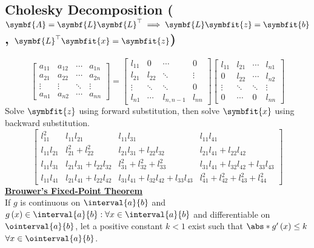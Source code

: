 \documentclass{article}
\begin{document}
\begin{minipage}[t]{126.1962963mm}
    \subsection{Cholesky Decomposition (\texorpdfstring{\(\symbf{A} = \symbf{L} \symbf{L}^\top \implies \symbf{L} \symbfit{z} = \symbfit{b}\), \(\symbf{L}^\top \symbfit{x} = \symbfit{z}\)}{A = L LT => L z = b, LT x = z})}
    \begin{equation*}
        \begin{bmatrix}
            a_{11} & a_{12} & \cdots & a_{1n} \\
            a_{21} & a_{22} & \cdots & a_{2n} \\
            \vdots & \vdots & \ddots & \vdots \\
            a_{n1} & a_{n2} & \cdots & a_{nn}
        \end{bmatrix} =
        \begin{bmatrix}
            l_{11} & 0      & \cdots    & 0      \\
            l_{21} & l_{22} & \ddots    & \vdots \\
            \vdots & \ddots & \ddots    & 0      \\
            l_{n1} & \cdots & l_{n,n-1} & l_{nn}
        \end{bmatrix}
        \begin{bmatrix}
            l_{11} & l_{21} & \cdots & l_{n1} \\
            0      & l_{22} & \cdots & l_{n2} \\
            \vdots & \ddots & \ddots & \vdots \\
            0      & \cdots & 0      & l_{nn}
        \end{bmatrix}
    \end{equation*}
    Solve \(\symbfit{z}\) using forward substitution, then solve \(\symbfit{x}\) using backward substitution.
    \begin{equation*}
        \begin{bmatrix}
            l_{11}^2      & l_{11} l_{21}               & l_{11} l_{31}                             & l_{11} l_{41}                             \\
            l_{11} l_{21} & l_{21}^2+l_{22}^2           & l_{21} l_{31}+l_{22} l_{32}               & l_{21} l_{41}+l_{22} l_{42}               \\
            l_{11} l_{31} & l_{21} l_{31}+l_{22} l_{32} & l_{31}^2+l_{32}^2+l_{33}^2                & l_{31} l_{41}+l_{32} l_{42}+l_{33} l_{43} \\
            l_{11} l_{41} & l_{21} l_{41}+l_{22} l_{42} & l_{31} l_{41}+l_{32} l_{42}+l_{33} l_{43} & l_{41}^2+l_{42}^2+l_{43}^2+l_{44}^2
        \end{bmatrix}
    \end{equation*}
    \underline{\textbf{Brouwer's Fixed-Point Theorem}} \\
    If \(g\) is continuous on \(\interval{a}{b}\) and \(g\left( x \right) \in \interval{a}{b} : \forall x \in \interval{a}{b}\)
    and differentiable on \(\ointerval{a}{b}\), let a positive constant
    \(k < 1\) exist such that \(\abs*{g'\left( x \right)} \leq k\) \(\forall x \in \ointerval{a}{b}\).


\end{minipage}
\end{document}
